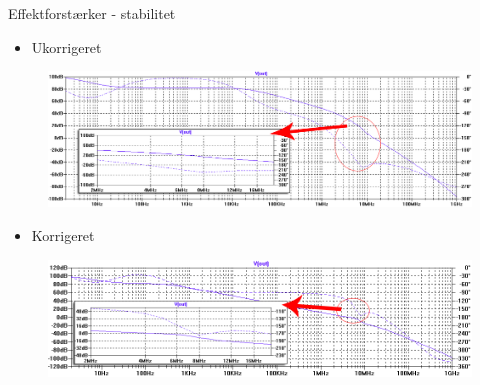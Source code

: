 

\begin{frame}{Effektforstærker - stabilitet}

\begin{itemize}
\item Ukorrigeret
\end{itemize}
\begin{figure}[h]
\centering
\includegraphics[width=\textwidth]{images/stabilitet-udenc-graf.png}
\end{figure}

\begin{itemize}
\item Korrigeret
\end{itemize}
\begin{figure}[h]
\centering
\includegraphics[width=\textwidth]{images/stabilitet-medc-graf.png}
\end{figure}

\end{frame}


